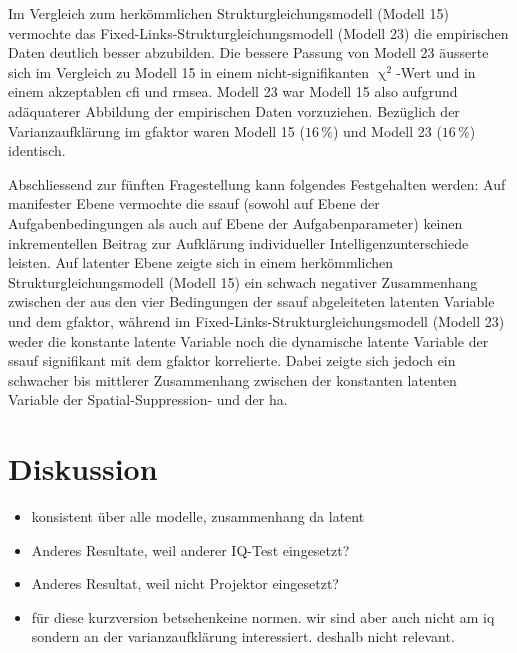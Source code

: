 \documentclass[11pt, twoside, a4paper]{book}		%
\begin{document}
Im Vergleich zum herkömmlichen Strukturgleichungsmodell (Modell 15) vermochte das Fixed-Links-Strukturgleichungsmodell (Modell 23) die empirischen Daten deutlich besser abzubilden. Die bessere Passung von Modell 23 äusserte sich im Vergleich zu Modell 15 in einem nicht-signifikanten $\upchi^2$-Wert und in einem akzeptablen \gls{cfi} und \gls{rmsea}. Modell 23 war Modell 15 also aufgrund adäquaterer Abbildung der empirischen Daten vorzuziehen. 
Bezüglich der Varianzaufklärung im \gls{gfaktor} waren Modell 15 ($16\,\%$) und Modell 23 ($16\,\%$) identisch. 

Abschliessend zur fünften Fragestellung kann folgendes Festgehalten werden: Auf manifester Ebene vermochte die \gls{ssauf} (sowohl auf Ebene der Aufgabenbedingungen als auch auf Ebene der Aufgabenparameter) keinen inkrementellen Beitrag zur Aufklärung individueller Intelligenzunterschiede leisten. Auf latenter Ebene zeigte sich in einem herkömmlichen Strukturgleichungsmodell (Modell 15) ein schwach negativer Zusammenhang zwischen der aus den vier Bedingungen der \gls{ssauf} abgeleiteten latenten Variable und dem \gls{gfaktor}, während im Fixed-Links-Strukturgleichungsmodell (Modell 23) weder die konstante latente Variable noch die dynamische latente Variable der \gls{ssauf} signifikant mit dem \gls{gfaktor} korrelierte. Dabei zeigte sich jedoch ein schwacher bis mittlerer Zusammenhang zwischen der konstanten latenten Variable der Spatial-Suppression- und der \gls{ha}.
















\chapter{Diskussion \label{cha:Diskussion}}
\begin{itemize}
	\item konsistent über alle modelle, zusammenhang da latent
	\item Anderes Resultate, weil anderer IQ-Test eingesetzt?
	\item Anderes Resultat, weil nicht Projektor eingesetzt?
	\item für diese kurzversion betsehenkeine normen. wir sind aber auch nicht am iq sondern an der varianzaufklärung interessiert. deshalb nicht relevant.
\end{itemize}
\end{document}
